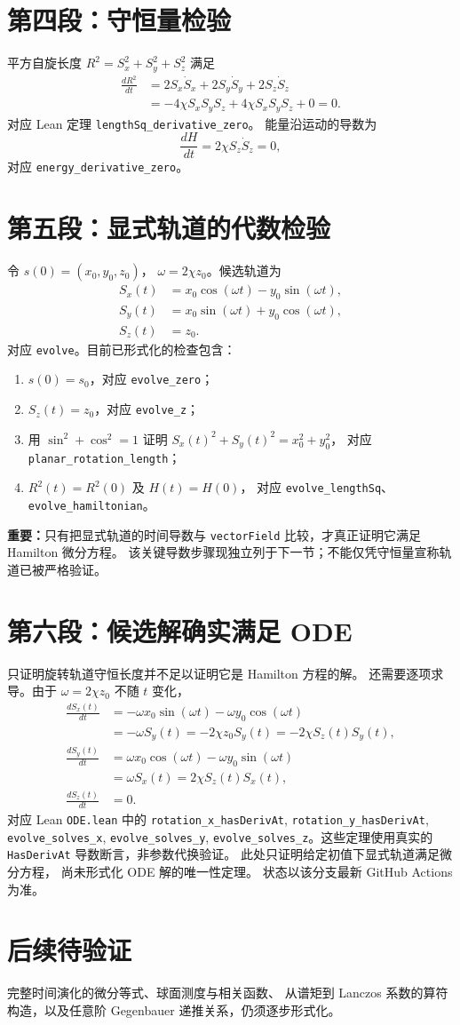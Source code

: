 \documentclass[UTF8,11pt]{ctexart}
\begin{document}
\section{第四段：守恒量检验}
平方自旋长度 $R^2=S_x^2+S_y^2+S_z^2$ 满足
\[
 \begin{aligned}
 \frac{dR^2}{dt}
 &=2S_x\dot S_x+2S_y\dot S_y+2S_z\dot S_z\\
 &=-4\chi S_xS_yS_z+4\chi S_xS_yS_z+0
 =0.
 \end{aligned}
\]
对应 Lean 定理 \texttt{lengthSq\_derivative\_zero}。
能量沿运动的导数为
\[
 \frac{dH}{dt}=2\chi S_z\dot S_z=0,
\]
对应 \texttt{energy\_derivative\_zero}。

\section{第五段：显式轨道的代数检验}
令 $s(0)=(x_0,y_0,z_0)$，
$\omega=2\chi z_0$。候选轨道为
\[
 \begin{split}
 S_x(t)&=x_0\cos(\omega t)-y_0\sin(\omega t),\\
 S_y(t)&=x_0\sin(\omega t)+y_0\cos(\omega t),\\
 S_z(t)&=z_0.
 \end{split}
\]
对应 \texttt{evolve}。目前已形式化的检查包含：
\begin{enumerate}
 \item $s(0)=s_0$，对应 \texttt{evolve\_zero}；
 \item $S_z(t)=z_0$，对应 \texttt{evolve\_z}；
 \item 用 $\sin^2+\cos^2=1$ 证明
 $S_x(t)^2+S_y(t)^2=x_0^2+y_0^2$，
 对应 \texttt{planar\_rotation\_length}；
 \item $R^2(t)=R^2(0)$ 及 $H(t)=H(0)$，
 对应 \texttt{evolve\_lengthSq}、\texttt{evolve\_hamiltonian}。
\end{enumerate}
\textbf{重要：}只有把显式轨道的时间导数与
\texttt{vectorField} 比较，才真正证明它满足 Hamilton 微分方程。
该关键导数步骤现独立列于下一节；不能仅凭守恒量宣称轨道已被严格验证。

\section{第六段：候选解确实满足 ODE}
只证明旋转轨道守恒长度并不足以证明它是 Hamilton 方程的解。
还需要逐项求导。由于 $\omega=2\chi z_0$ 不随 $t$ 变化，
\[
 \begin{aligned}
 \frac{dS_x(t)}{dt}
 &=-\omega x_0\sin(\omega t)-\omega y_0\cos(\omega t)\\
 &=-\omega S_y(t)=-2\chi z_0 S_y(t)
 =-2\chi S_z(t)S_y(t),\\
 \frac{dS_y(t)}{dt}
 &=\omega x_0\cos(\omega t)-\omega y_0\sin(\omega t)\\
 &=\omega S_x(t)=2\chi S_z(t)S_x(t),\\
 \frac{dS_z(t)}{dt}&=0.
 \end{aligned}
\]
对应 Lean \texttt{ODE.lean} 中的
\texttt{rotation\_x\_hasDerivAt}, \texttt{rotation\_y\_hasDerivAt},
\texttt{evolve\_solves\_x}, \texttt{evolve\_solves\_y},
\texttt{evolve\_solves\_z}。这些定理使用真实的
\texttt{HasDerivAt} 导数断言，非参数代换验证。
此处只证明给定初值下显式轨道满足微分方程，
尚未形式化 ODE 解的唯一性定理。
状态以该分支最新 GitHub Actions 为准。

\section{后续待验证}
完整时间演化的微分等式、球面测度与相关函数、
从谱矩到 Lanczos 系数的算符构造，以及任意阶
Gegenbauer 递推关系，仍须逐步形式化。
\end{document}
